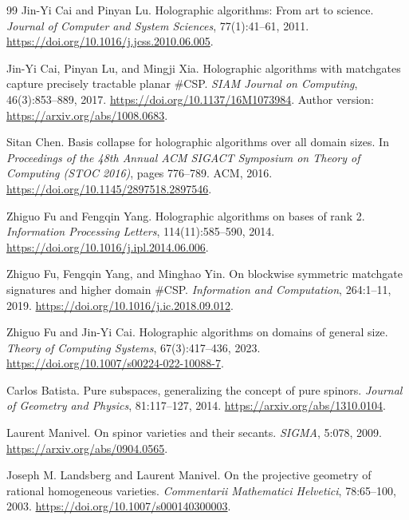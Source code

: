 \documentclass[11pt]{article}
\theoremstyle{definition}
\theoremstyle{remark}
\begin{document}
\begin{thebibliography}{99}
Jin-Yi Cai and Pinyan Lu.
\newblock Holographic algorithms: From art to science.
\newblock \emph{Journal of Computer and System Sciences}, 77(1):41--61,
2011.
\newblock \url{https://doi.org/10.1016/j.jcss.2010.06.005}.

Jin-Yi Cai, Pinyan Lu, and Mingji Xia.
\newblock Holographic algorithms with matchgates capture precisely tractable
planar \#CSP.
\newblock \emph{SIAM Journal on Computing}, 46(3):853--889, 2017.
\newblock \url{https://doi.org/10.1137/16M1073984}.
\newblock Author version: \url{https://arxiv.org/abs/1008.0683}.

Sitan Chen.
\newblock Basis collapse for holographic algorithms over all domain sizes.
\newblock In \emph{Proceedings of the 48th Annual ACM SIGACT Symposium on
Theory of Computing (STOC 2016)}, pages 776--789. ACM, 2016.
\newblock \url{https://doi.org/10.1145/2897518.2897546}.

Zhiguo Fu and Fengqin Yang.
\newblock Holographic algorithms on bases of rank 2.
\newblock \emph{Information Processing Letters}, 114(11):585--590, 2014.
\newblock \url{https://doi.org/10.1016/j.ipl.2014.06.006}.

Zhiguo Fu, Fengqin Yang, and Minghao Yin.
\newblock On blockwise symmetric matchgate signatures and higher domain
\#CSP.
\newblock \emph{Information and Computation}, 264:1--11, 2019.
\newblock \url{https://doi.org/10.1016/j.ic.2018.09.012}.

Zhiguo Fu and Jin-Yi Cai.
\newblock Holographic algorithms on domains of general size.
\newblock \emph{Theory of Computing Systems}, 67(3):417--436, 2023.
\newblock \url{https://doi.org/10.1007/s00224-022-10088-7}.

Carlos Batista.
\newblock Pure subspaces, generalizing the concept of pure spinors.
\newblock \emph{Journal of Geometry and Physics}, 81:117--127, 2014.
\newblock \url{https://arxiv.org/abs/1310.0104}.

Laurent Manivel.
\newblock On spinor varieties and their secants.
\newblock \emph{SIGMA}, 5:078, 2009.
\newblock \url{https://arxiv.org/abs/0904.0565}.

Joseph M. Landsberg and Laurent Manivel.
\newblock On the projective geometry of rational homogeneous varieties.
\newblock \emph{Commentarii Mathematici Helvetici}, 78:65--100, 2003.
\newblock \url{https://doi.org/10.1007/s000140300003}.


\end{thebibliography}
\end{document}
